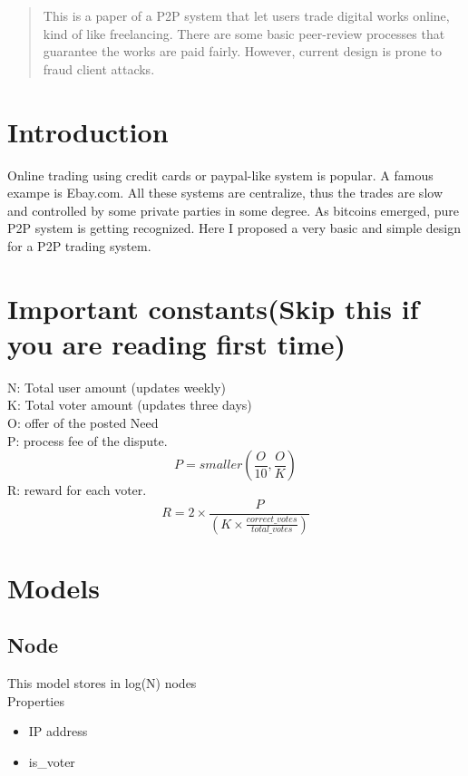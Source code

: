 \documentclass[12pt]{article}
\begin{document}
\maketitle

\begin{abstract}
This is a paper of a P2P system that let users trade digital works online, kind of like freelancing. There are some basic peer-review processes that guarantee the works are paid fairly. However, current design is prone to fraud client attacks.
\end{abstract}

\section{Introduction}
Online trading using credit cards or paypal-like system is popular. A famous exampe is Ebay.com. All these systems are centralize, thus the trades are slow and controlled by some private parties in some degree. As bitcoins emerged, pure P2P system is getting recognized. Here I proposed a very basic and simple design for a P2P trading system. 

\section{Important constants(Skip this if you are reading first time)}
N: Total user amount (updates weekly)\\
K: Total voter amount (updates three days)\\
O: offer of the posted Need\\
P: process fee of the dispute. 
\[
P = smaller(\frac{O}{10}, \frac{O}{K})
\]
R: reward for each voter. 
\[
R = 2 \times \frac{P}{(K \times \frac{correct\_votes}{total\_votes})}
\]

\section{Models}

\subsection{Node}
This model stores in log(N) nodes\\
Properties
\begin{itemize}
	\item IP address
	\item is\_voter
\end{itemize}
\end{document}
